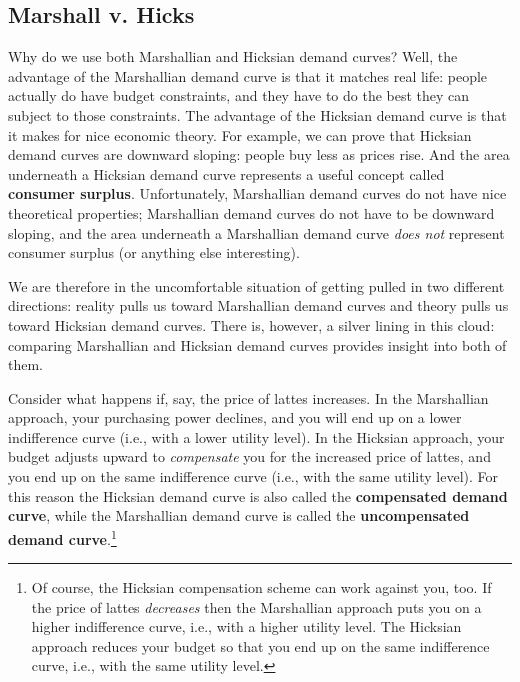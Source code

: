 \subsection*{Marshall v. Hicks}

Why do we use both Marshallian and Hicksian demand curves? Well, the advantage of the Marshallian demand curve is that it matches real life: people actually do have budget constraints, and they have to do the best they can subject to those constraints. The advantage of the Hicksian demand curve is that it makes for nice economic theory. For example, we can prove that Hicksian demand curves are downward sloping: people buy less as prices rise. And the area underneath a Hicksian demand curve represents a useful concept called \textbf{consumer surplus}. Unfortunately, Marshallian demand curves do not have nice theoretical properties; Marshallian demand curves do not have to be downward sloping, and the area underneath a Marshallian demand curve \emph{does not} represent consumer surplus (or anything else interesting).

We are therefore in the uncomfortable situation of getting pulled in two different directions: reality pulls us toward Marshallian demand curves and theory pulls us toward Hicksian demand curves. There is, however, a silver lining in this cloud: comparing Marshallian and Hicksian demand curves provides insight into both of them.

Consider what happens if, say, the price of lattes increases. In the Marshallian approach, your purchasing power declines, and you will end up on a lower indifference curve (i.e., with a lower utility level). In the Hicksian approach, your budget adjusts upward to \emph{compensate} you for the increased price of lattes, and you end up on the same indifference curve (i.e., with the same utility level). For this reason the Hicksian demand curve is also called the \textbf{compensated demand curve}, while the Marshallian demand curve is called the \textbf{uncompensated demand curve}.\footnote{Of course, the Hicksian compensation scheme can work against you, too. If the price of lattes \emph{decreases} then the Marshallian approach puts you on a higher indifference curve, i.e., with a higher utility level. The Hicksian approach reduces your budget so that you end up on the same indifference curve, i.e., with the same utility level.}

